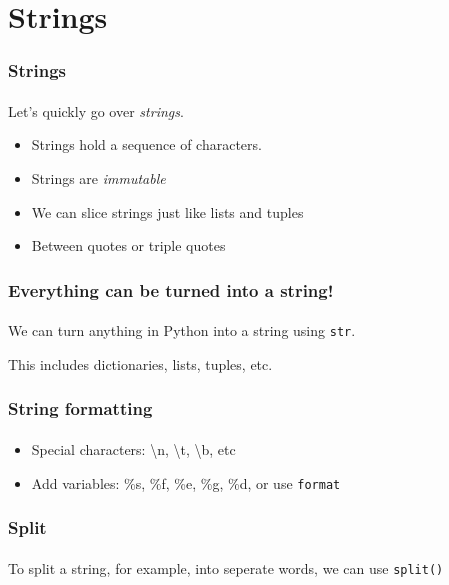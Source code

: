 \section{Strings} %
\label{sec:strings}

\begin{frame}\frametitle{Strings}
    \framesubtitle{}

    Let's quickly go over \emph{strings}.


    \begin{itemize}
        \item Strings hold a sequence of characters.
        \item Strings are \emph{immutable}
        \item We can slice strings just like lists and tuples
        \item Between quotes or triple quotes
    \end{itemize}

\end{frame}

\begin{frame}\frametitle{Everything can be turned into a string!}
    \framesubtitle{}


    We can turn anything in Python into a string using \texttt{str}.

    \vfill

    This includes dictionaries, lists, tuples, etc.

\end{frame}

\begin{frame}\frametitle{String formatting}
    \framesubtitle{}

    \begin{itemize}
        \item Special characters: \textbackslash n, \textbackslash t,
        \textbackslash b, etc
        \item Add variables: \%s, \%f, \%e, \%g, \%d, or use \texttt{format}
    \end{itemize}


\end{frame}

\begin{frame}\frametitle{Split}
    \framesubtitle{}

    To split a string, for example, into seperate words, we can use \texttt{split()}


\end{frame}

